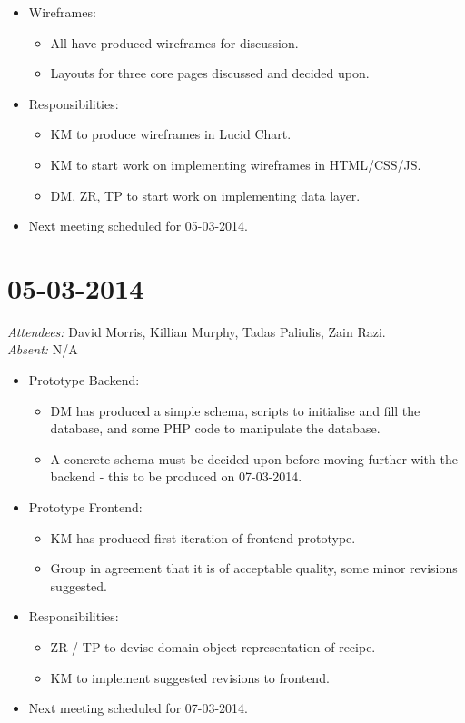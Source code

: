 \documentclass{article}
\begin{document}
\begin{itemize}
\item Wireframes:
  \begin{itemize}
  \item All have produced wireframes for discussion.
  \item Layouts for three core pages discussed and decided upon.
  \end{itemize}
\item Responsibilities:
  \begin{itemize}
  \item KM to produce wireframes in Lucid Chart.
  \item KM to start work on implementing wireframes in HTML/CSS/JS.
  \item DM, ZR, TP to start work on implementing data layer.
  \end{itemize}
\item Next meeting scheduled for 05-03-2014.
\end{itemize}


\clearpage

\section*{05-03-2014}
\vspace{0.5cm}
\emph{Attendees: }David Morris, Killian Murphy, Tadas Paliulis, Zain Razi.
\\
\emph{Absent: }N/A

\begin{itemize}
\item Prototype Backend:
  \begin{itemize}
  \item DM has produced a simple schema, scripts to initialise and fill the database, and some PHP code to manipulate the database.
  \item A concrete schema must be decided upon before moving further with the backend - this to be produced on 07-03-2014.
  \end{itemize}
\item Prototype Frontend:
  \begin{itemize}
  \item KM has produced first iteration of frontend prototype.
  \item Group in agreement that it is of acceptable quality, some minor revisions suggested.
  \end{itemize}
\item Responsibilities:
  \begin{itemize}
  \item ZR / TP to devise domain object representation of recipe.
  \item KM to implement suggested revisions to frontend.
  \end{itemize}
\item Next meeting scheduled for 07-03-2014.
\end{itemize}
\end{document}
